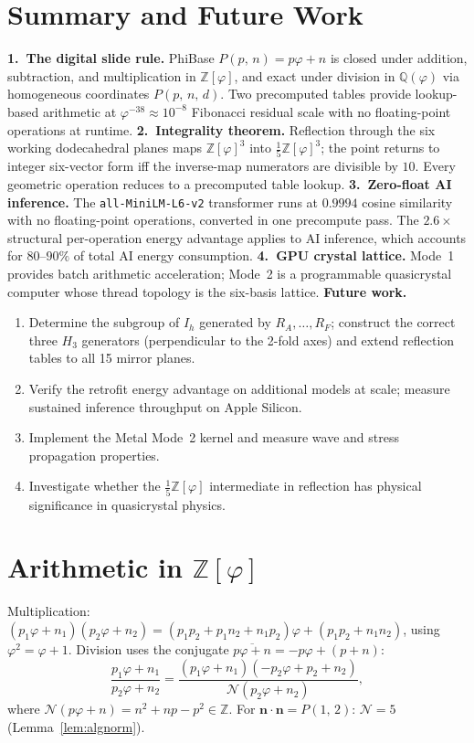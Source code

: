 \documentclass[12pt]{article}
\theoremstyle{definition}
\theoremstyle{remark}
\newcommand{\Z}{\mathbb{Z}}
\newcommand{\Zphi}{\mathbb{Z}[\varphi]}
\newcommand{\Qphi}{\mathbb{Q}(\varphi)}
\newcommand{\Phib}[2]{P(#1,\,#2)}
\newcommand{\Phibd}[3]{P(#1,\,#2,\,#3)}
\begin{document}
\section{Summary and Future Work}
\label{sec:future}
\noindent\textbf{1.\ The digital slide rule.}
PhiBase $\Phib{p}{n}=p\varphi+n$ is closed under addition, subtraction,
and multiplication in $\Zphi$, and exact under division in $\Qphi$ via
homogeneous coordinates $\Phibd{p}{n}{d}$.  Two precomputed tables
provide lookup-based arithmetic at $\varphi^{-38}\approx10^{-8}$
Fibonacci residual scale with no floating-point operations at runtime.
\medskip
\noindent\textbf{2.\ Integrality theorem.}
Reflection through the six working dodecahedral planes maps $\Zphi^3$
into $\tfrac{1}{5}\Zphi^3$; the point returns to integer six-vector
form iff the inverse-map numerators are divisible by $10$.  Every
geometric operation reduces to a precomputed table lookup.
\medskip
\noindent\textbf{3.\ Zero-float AI inference.}
The \texttt{all-MiniLM-L6-v2} transformer runs at $0.9994$ cosine
similarity with no floating-point operations, converted in one
precompute pass.  The $2.6\times$ structural per-operation energy
advantage applies to AI inference, which accounts for $80$--$90\%$
of total AI energy consumption.
\medskip
\noindent\textbf{4.\ GPU crystal lattice.}
Mode~1 provides batch arithmetic acceleration; Mode~2 is a programmable
quasicrystal computer whose thread topology is the six-basis lattice.
\medskip
\noindent\textbf{Future work.}
\begin{enumerate}[leftmargin=*]
\item Determine the subgroup of $I_h$ generated by $R_A,\ldots,R_F$;
  construct the correct three $H_3$ generators (perpendicular to the
  2-fold axes) and extend reflection tables to all 15 mirror planes.
\item Verify the retrofit energy advantage on additional models at
  scale; measure sustained inference throughput on Apple Silicon.
\item Implement the Metal Mode~2 kernel and measure wave and stress
  propagation properties.
\item Investigate whether the $\tfrac{1}{5}\Zphi$ intermediate in
  reflection has physical significance in quasicrystal physics.
\end{enumerate}
\appendix
\section{Arithmetic in $\mathbb{Z}[\varphi]$}
Multiplication:
$(p_1\varphi+n_1)(p_2\varphi+n_2)
=(p_1p_2+p_1n_2+n_1p_2)\varphi+(p_1p_2+n_1n_2)$,
using $\varphi^2=\varphi+1$.
Division uses the conjugate $\overline{p\varphi+n}=-p\varphi+(p+n)$:
\[
  \frac{p_1\varphi+n_1}{p_2\varphi+n_2}
  =\frac{(p_1\varphi+n_1)(-p_2\varphi+p_2+n_2)}{\mathcal{N}(p_2\varphi+n_2)},
\]
where $\mathcal{N}(p\varphi+n)=n^2+np-p^2\in\Z$.
For $\mathbf{n}\cdot\mathbf{n}=\Phib{1}{2}$: $\mathcal{N}=5$
(Lemma~\ref{lem:algnorm}).
\end{document}
